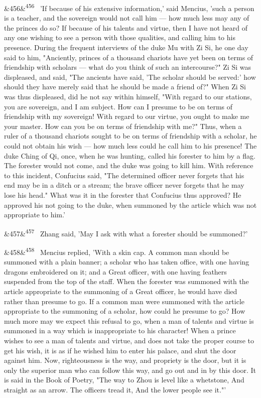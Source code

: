 \documentclass[12pt]{article}
\newcommand{\para}[1][]{\par\noindent\ifx&#1&\else\textsuperscript{\footnotesize #1}~\fi}
\begin{document}
\para[456] 'If because of his extensive information,' said Mencius, 'such a person is a teacher, and the sovereign would not call him --- how much less may any of the princes do so? If because of his talents and virtue, then I have not heard of any one wishing to see a person with those qualities, and calling him to his presence. During the frequent interviews of the duke Mu with Zi Si, he one day said to him, "Anciently, princes of a thousand chariots have yet been on terms of friendship with scholars --- what do you think of such an intercourse?" Zi Si was displeased, and said, "The ancients have said, 'The scholar should be served:' how should they have merely said that he should be made a friend of?" When Zi Si was thus displeased, did he not say within himself, "With regard to our stations, you are sovereign, and I am subject. How can I presume to be on terms of friendship with my sovereign! With regard to our virtue, you ought to make me your master. How can you be on terms of friendship with me?" Thus, when a ruler of a thousand chariots sought to be on terms of friendship with a scholar, he could not obtain his wish --- how much less could he call him to his presence! The duke Ching of Qi, once, when he was hunting, called his forester to him by a flag. The forester would not come, and the duke was going to kill him. With reference to this incident, Confucius said, "The determined officer never forgets that his end may be in a ditch or a stream; the brave officer never forgets that he may lose his head." What was it in the forester that Confucius thus approved? He approved his not going to the duke, when summoned by the article which was not appropriate to him.'

\para[457] Zhang said, 'May I ask with what a forester should be summoned?'

\para[458] Mencius replied, 'With a skin cap. A common man should be summoned with a plain banner; a scholar who has taken office, with one having dragons embroidered on it; and a Great officer, with one having feathers suspended from the top of the staff. When the forester was summoned with the article appropriate to the summoning of a Great officer, he would have died rather than presume to go. If a common man were summoned with the article appropriate to the summoning of a scholar, how could he presume to go? How much more may we expect this refusal to go, when a man of talents and virtue is summoned in a way which is inappropriate to his character! When a prince wishes to see a man of talents and virtue, and does not take the proper course to get his wish, it is as if he wished him to enter his palace, and shut the door against him. Now, righteousness is the way, and propriety is the door, but it is only the superior man who can follow this way, and go out and in by this door. It is said in the Book of Poetry, "The way to Zhou is level like a whetstone, And straight as an arrow. The officers tread it, And the lower people see it."'
\end{document}
